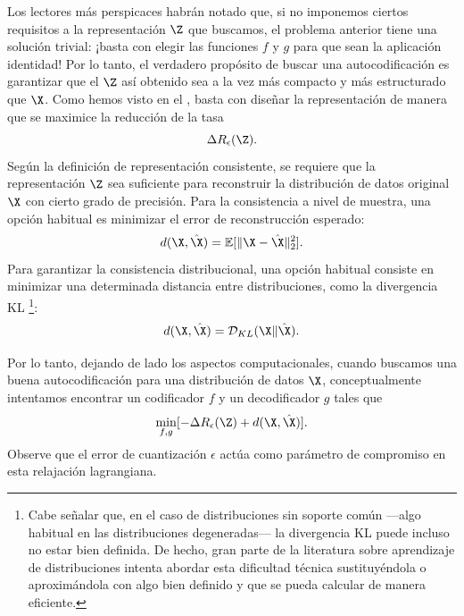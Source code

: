 \documentclass[../../book-main_es.tex]{subfiles}
\begin{document}
Los lectores más perspicaces habrán notado que, si no imponemos ciertos
requisitos a la representación $\Z$ que buscamos, el problema anterior tiene
una solución trivial: ¡basta con elegir las funciones $f$ y $g$
para que sean la aplicación identidad! Por lo tanto, el verdadero propósito de buscar una
autocodificación es garantizar que el $\Z$ así obtenido sea a la vez más
compacto y más estructurado que $\X$.
Como hemos visto en el ,
basta con diseñar la representación de manera que se maximice la reducción de la tasa
\begin{equation}
    \Delta R_{\epsilon}(\Z).
\end{equation}%
Según la definición de representación consistente, se requiere que
la representación $\Z$ sea suficiente para reconstruir la distribución de datos original
$\X$ con cierto grado de precisión. Para la consistencia a nivel de muestra,
una opción habitual es minimizar el error de reconstrucción esperado:
\begin{equation}
    d(\X, \hat \X) = \mathbb{E}[\|\X - \hat\X\|_2^2].
\end{equation}
Para garantizar la consistencia distribucional, una opción habitual consiste en minimizar una
determinada distancia entre distribuciones, como la divergencia KL
\footnote{Cabe señalar que, en el caso de distribuciones sin
    soporte común ---algo habitual en las distribuciones degeneradas--- la divergencia KL
    puede incluso no estar bien definida. De hecho, gran parte de la literatura sobre
    aprendizaje de distribuciones intenta abordar esta dificultad técnica
    sustituyéndola o aproximándola con algo bien definido y
que se pueda calcular de manera eficiente.}:
\begin{equation}
    d(\X, \hat \X) = \mathcal{D}_{KL}(\X\|\hat\X).
\end{equation}

Por lo tanto, dejando de lado los aspectos computacionales, cuando 
buscamos una buena autocodificación para una distribución de datos
$\X$, conceptualmente intentamos encontrar un codificador $f$ y
un decodificador $g$ tales que
\begin{equation}
    \min_{f, g} [- \Delta R_{\epsilon}(\Z) + d(\X, \hat \X)].
    \label{eqn:autoencode-objective-ch5}
\end{equation}
Observe que el error de cuantización $\epsilon$ actúa como parámetro de compromiso 
en esta relajación lagrangiana.
\end{document}
